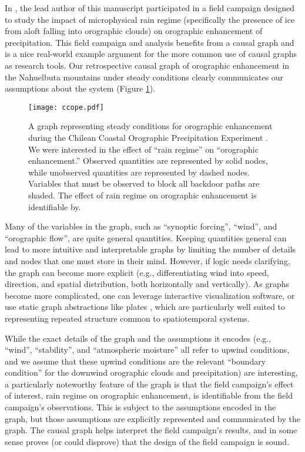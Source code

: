 \documentclass[12pt]{article}
\begin{document}
In \citet{massmann2017}, the lead author of this manuscript
participated in a field campaign designed to study the impact of
microphysical rain regime (specifically the presence of ice from aloft
falling into orographic clouds) on orographic enhancement of
precipitation. This field campaign and analysis benefits from a causal
graph and is a nice real-world example argument for the more common
use of causal graphs as research tools. Our retrospective causal graph
of orographic enhancement in the Nahuelbuta mountains under steady
conditions clearly communicates our assumptions about the system
(Figure \ref{fig:ccope}).

\begin{figure} \texttt{[image: ccope.pdf]}
  \caption{A graph representing steady conditions for orographic
    enhancement during the Chilean Coastal Orographic Precipitation
    Experiment \citep[CCOPE,][]{massmann2017}. We were interested in
    the effect of ``rain regime'' on ``orographic enhancement.''
    Observed quantities are represented by solid nodes, while
    unobserved quantities are represented by dashed nodes. Variables
    that must be observed to block all backdoor paths are shaded. The
    effect of rain regime on orographic enhancement is identifiable
    by.}
  \label{fig:ccope}
\end{figure}

Many of the variables in the graph, such as ``synoptic forcing'',
``wind'', and ``orographic flow'', are quite general
quantities. Keeping quantities general can lead to more intuitive and
interpretable graphs by limiting the number of details and nodes that
one must store in their mind. However, if logic needs clarifying, the
graph can become more explicit (e.g., differentiating wind into speed,
direction, and spatial distribution, both horizontally and
vertically). As graphs become more complicated, one can leverage
interactive visualization software, or use static graph abstractions
like plates \citep{bishop2006pattern}, which are particularly well
suited to representing repeated structure common to spatiotemporal
systems.

While the exact details of the graph and the assumptions it encodes
(e.g., ``wind'', ``stability'', and ``atmospheric moisture'' all refer
to upwind conditions, and we assume that these upwind conditions are
the relevant ``boundary condition'' for the downwind orographic clouds
and precipitation) are interesting, a particularly noteworthy feature
of the graph is that the field campaign's effect of interest, rain
regime on orographic enhancement, is identifiable from the field
campaign's observations. This is subject to the assumptions encoded in
the graph, but those assumptions are explicitly represented and
communicated by the graph. The causal graph helps interpret the field
campaign's results, and in some sense proves (or could disprove) that
the design of the field campaign is sound.
\end{document}
